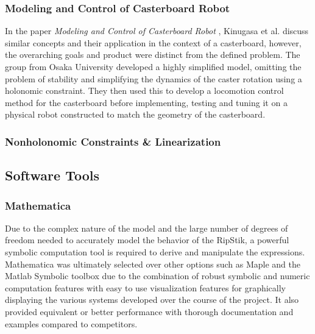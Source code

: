 \subsubsection{Modeling and Control of Casterboard Robot}
In the paper \textit{Modeling and Control of Casterboard Robot} \cite{robot}, Kinugasa et al. discuss similar concepts and their application in the context of a casterboard, however, the overarching goals and product were distinct from the defined problem.
The group from Osaka University developed a highly simplified model, omitting the problem of stability and simplifying the dynamics of the caster rotation using a holonomic constraint. 
They then used this to develop a locomotion control method for the casterboard before implementing, testing and tuning it on a physical robot constructed to match the geometry of the casterboard.

\subsubsection{Nonholonomic Constraints \& Linearization}
\subsection{Software Tools}
\subsubsection{Mathematica}
Due to the complex nature of the model and the large number of degrees of freedom needed to accurately model the behavior of the RipStik, a powerful symbolic computation tool is required to derive and manipulate the expressions. 
Mathematica was ultimately selected over other options such as Maple and the Matlab Symbolic toolbox due to the combination of robust symbolic and numeric computation features with easy to use visualization features for graphically displaying the various systems developed over the course of the project.
It also provided equivalent or better performance with thorough documentation and examples compared to competitors.

